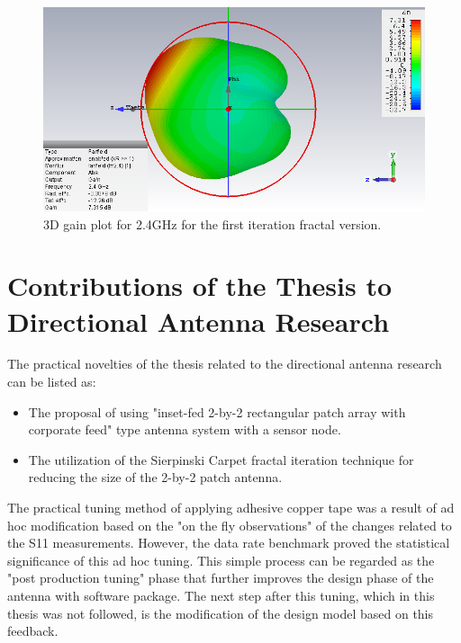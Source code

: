 \documentclass[12pt, oneandhalf, chaparabic, sees, ms]{metu}
\begin{document}
\begin{figure}[!htbp]
 \begin{center}
  \includegraphics[width=\textwidth]{T2x2-rect-pa-corp-feed-FR4-018mm-connected-by-boolean-add-sierpinski1-0625-FarField-24GHz-3D.png}
 \end{center}
 \caption{3D gain plot for 2.4GHz for the first iteration fractal version.}
  \label{fig:sierpinski-gain}
\end{figure}







\newpage
\section{Contributions of the Thesis to Directional Antenna Research}\label{scontribdantenna}

The practical novelties of the thesis related to the directional antenna research can be listed as:
\begin{itemize} 
\setlength{\itemsep}{0em}
\item The proposal of using "inset-fed 2-by-2 rectangular patch array with corporate feed" type antenna system with a sensor node.
\item The utilization of the Sierpinski Carpet fractal iteration technique for reducing the size of the 2-by-2 patch antenna.
\end{itemize} 


The practical tuning method of applying adhesive copper tape was a result of ad hoc modification based on 
the "on the fly observations" of the changes related to the S11 measurements. 
However, the data rate benchmark proved the statistical significance of this ad hoc tuning.
This simple process can be regarded as the "post production tuning" phase that further improves the design phase of the antenna with software package.
The next step after this tuning, which in this thesis was not followed, is the modification of the design model based on this feedback.
\end{document}
